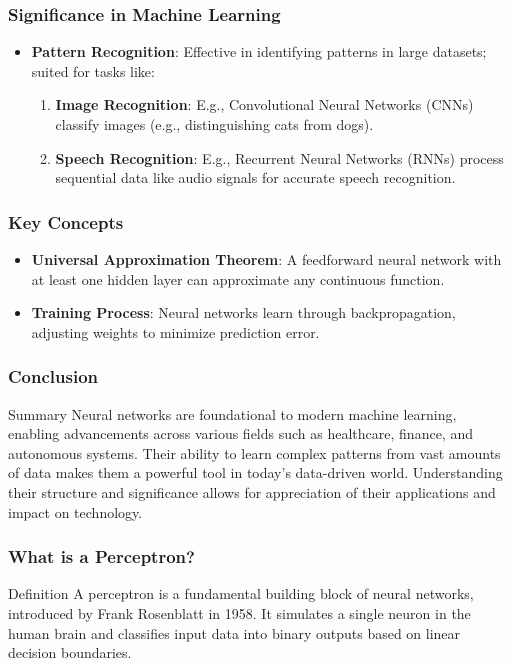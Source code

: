 \documentclass[aspectratio=169]{beamer}
\begin{document}
\begin{frame}[fragile]
    \frametitle{Significance in Machine Learning}
    \begin{itemize}
        \item \textbf{Pattern Recognition}: Effective in identifying patterns in large datasets; suited for tasks like:
        \begin{enumerate}
            \item \textbf{Image Recognition}: E.g., Convolutional Neural Networks (CNNs) classify images (e.g., distinguishing cats from dogs).
            \item \textbf{Speech Recognition}: E.g., Recurrent Neural Networks (RNNs) process sequential data like audio signals for accurate speech recognition.
        \end{enumerate}
    \end{itemize}
\end{frame}

\begin{frame}[fragile]
    \frametitle{Key Concepts}
    \begin{itemize}
        \item \textbf{Universal Approximation Theorem}: A feedforward neural network with at least one hidden layer can approximate any continuous function.
        \item \textbf{Training Process}: Neural networks learn through backpropagation, adjusting weights to minimize prediction error.
    \end{itemize}
\end{frame}

\begin{frame}[fragile]
    \frametitle{Conclusion}
    \begin{block}{Summary}
        Neural networks are foundational to modern machine learning, enabling advancements across various fields such as healthcare, finance, and autonomous systems. Their ability to learn complex patterns from vast amounts of data makes them a powerful tool in today’s data-driven world. Understanding their structure and significance allows for appreciation of their applications and impact on technology.
    \end{block}
\end{frame}

\begin{frame}[fragile]
    \frametitle{What is a Perceptron?}
    \begin{block}{Definition}
        A perceptron is a fundamental building block of neural networks, introduced by Frank Rosenblatt in 1958. It simulates a single neuron in the human brain and classifies input data into binary outputs based on linear decision boundaries.
    \end{block}
\end{frame}
\end{document}
